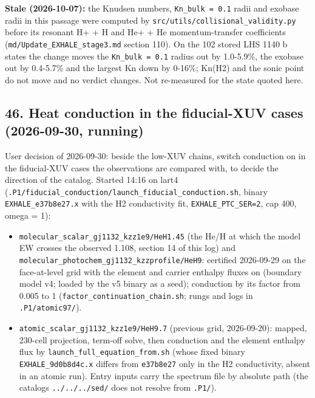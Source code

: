 \documentclass[english,a4paper]{my_memo}
\providecommand{\tightlist}{\setlength{\itemsep}{0pt}\setlength{\parskip}{0pt}}
\begin{document}
\textbf{Stale (2026-10-07):} the Knudsen numbers, \texttt{Kn\_bulk\ =\ 0.1} radii and exobase radii in this passage were computed by \texttt{src/utils/collisional\_validity.py} before its resonant H+ + H and He+ + He momentum-transfer coefficients (\texttt{md/Update\_EXHALE\_stage3.md} section 110). On the 102 stored LHS 1140 b states the change moves the \texttt{Kn\_bulk\ =\ 0.1} radius out by 1.0-5.9\%, the exobase out by 0.4-5.7\% and the largest Kn down by 0-16\%; Kn(H2) and the sonic point do not move and no verdict changes. Not re-measured for the state quoted here.

\subsection{46. Heat conduction in the fiducial-XUV cases (2026-09-30, running)}\label{46-heat-conduction-in-the-fiducial-xuv-cases-2026-09-30-running}

User decision of 2026-09-30: beside the low-XUV chains, switch conduction
on in the fiducial-XUV cases the observations are compared with, to decide
the direction of the catalog. Started 14:16 on lart4
(\texttt{.P1/fiducial\_conduction/launch\_fiducial\_conduction.sh}, binary
\texttt{EXHALE\_e37b8e27.x} with the H2 conductivity fit, \texttt{EXHALE\_PTC\_SER=2}, cap
400, omega = 1):

\begin{itemize}
\tightlist
\item
  \texttt{molecular\_scalar\_gj1132\_kzz1e9/HeH1.45} (the He/H at which the model EW
  crosses the observed 1.108, section 14 of this log) and
  \texttt{molecular\_photochem\_gj1132\_kzzprofile/HeH9}: certified 2026-09-29 on the
  face-at-level grid with the element and carrier enthalpy fluxes on
  (boundary model v4; loaded by the v5 binary as a seed); conduction by its
  factor from 0.005 to 1 (\texttt{factor\_continuation\_chain.sh}; rungs and logs in
  \texttt{.P1/atomic97/}).
\item
  \texttt{atomic\_scalar\_gj1132\_kzz1e9/HeH9.7} (previous grid, 2026-09-20): mapped,
  230-cell projection, term-off solve, then conduction and the element
  enthalpy flux by \texttt{launch\_full\_equation\_from.sh} (whose fixed binary
  \texttt{EXHALE\_9d0b8d4c.x} differs from \texttt{e37b8e27} only in the H2 conductivity,
  absent in an atomic run).
  Entry inputs carry the spectrum file by absolute path (the catalog\textquotesingle s
  \texttt{../../../sed/} does not resolve from \texttt{.P1/}).
\end{itemize}
\end{document}
